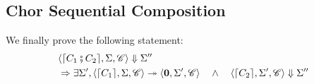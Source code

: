\documentclass[12pt,a4paper,twoside]{book}
\begin{document}
\begin{appendices}
\section{\textbf{Chor} Sequential Composition}
We finally prove the following statement:
\begin{align}
\begin{split}
\label{appdix:Bfat}
&\langle \lceil C_1 \fatsemi C_2\rceil, \Sigma, \mathscr{C}\rangle \Downarrow \Sigma''\\
&\Rightarrow \exists \Sigma',
\langle \lceil C_1 \rceil, \Sigma, \mathscr{C} \rangle \twoheadrightarrow \langle \boldsymbol{0}, \Sigma', \mathscr{C} \rangle 
\quad\land\quad
\langle \lceil C_2 \rceil, \Sigma', \mathscr{C} \rangle \Downarrow \Sigma''
\end{split}
\end{align}


\end{appendices}
\end{document}
